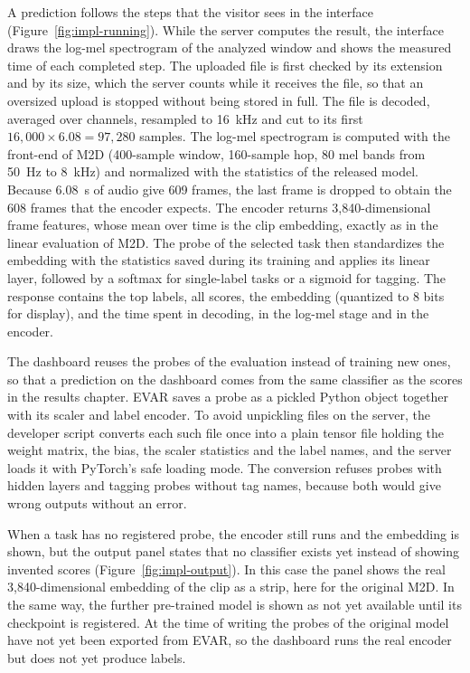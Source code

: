 A prediction follows the steps that the visitor sees in the interface (Figure~\ref{fig:impl-running}). While the server computes the result, the interface draws the log-mel spectrogram of the analyzed window and shows the measured time of each completed step. The uploaded file is first checked by its extension and by its size, which the server counts while it receives the file, so that an oversized upload is stopped without being stored in full. The file is decoded, averaged over channels, resampled to 16~kHz and cut to its first $16{,}000\times6.08=97{,}280$ samples. The log-mel spectrogram is computed with the front-end of M2D (400-sample window, 160-sample hop, 80 mel bands from 50~Hz to 8~kHz) and normalized with the statistics of the released model. Because 6.08~s of audio give 609 frames, the last frame is dropped to obtain the 608 frames that the encoder expects. The encoder returns 3,840-dimensional frame features, whose mean over time is the clip embedding, exactly as in the linear evaluation of M2D. The probe of the selected task then standardizes the embedding with the statistics saved during its training and applies its linear layer, followed by a softmax for single-label tasks or a sigmoid for tagging. The response contains the top labels, all scores, the embedding (quantized to 8 bits for display), and the time spent in decoding, in the log-mel stage and in the encoder.

The dashboard reuses the probes of the evaluation instead of training new ones, so that a prediction on the dashboard comes from the same classifier as the scores in the results chapter. EVAR saves a probe as a pickled Python object together with its scaler and label encoder. To avoid unpickling files on the server, the developer script converts each such file once into a plain tensor file holding the weight matrix, the bias, the scaler statistics and the label names, and the server loads it with PyTorch's safe loading mode. The conversion refuses probes with hidden layers and tagging probes without tag names, because both would give wrong outputs without an error.

When a task has no registered probe, the encoder still runs and the embedding is shown, but the output panel states that no classifier exists yet instead of showing invented scores (Figure~\ref{fig:impl-output}). In this case the panel shows the real 3,840-dimensional embedding of the clip as a strip, here for the original M2D. In the same way, the further pre-trained model is shown as not yet available until its checkpoint is registered. At the time of writing the probes of the original model have not yet been exported from EVAR, so the dashboard runs the real encoder but does not yet produce labels.

